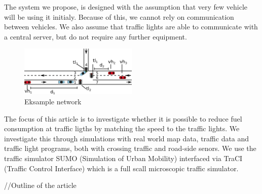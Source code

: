 The system we propose, is designed with the assumption that very few vehicle will be using it initialy. 
Because of this, we cannot rely on communication between vehicles.
We also assume that traffic lights are able to communicate with a central server, but do not require any further equipment.









\begin{figure}[htb]
\centering
\includegraphics[width=0.5\textwidth]{images/introNetwork.png}
\caption{Eksample network}
\label{fig:Introduction:network}
\end{figure}



The focus of this article is to investigate whether it is possible to reduce fuel consumption at traffic ligths by matching the speed to the traffic lights. 
We investigate this through simulations with real world map data, traffic data and traffic light programs, both with crossing traffic and road-side senors. %
We use the traffic simulator SUMO (Simulation of Urban Mobility)\cite{sumo} interfaced via TraCI (Traffic Control Interface)\cite{traci} which is a full scall microscopic traffic simulator.


//Outline of the article





